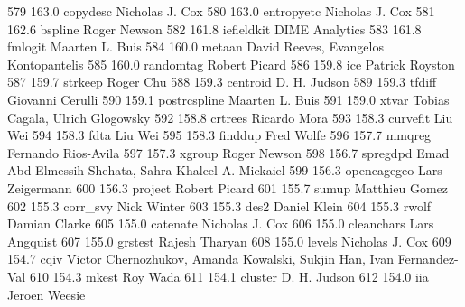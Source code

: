    579    163.0    copydesc      Nicholas J. Cox                         
   580    163.0    entropyetc    Nicholas J. Cox                         
   581    162.6    bspline       Roger Newson                            
   582    161.8    iefieldkit    DIME Analytics                          
   583    161.8    fmlogit       Maarten L. Buis                         
   584    160.0    metaan        David Reeves, Evangelos Kontopantelis   
   585    160.0    randomtag     Robert Picard                           
   586    159.8    ice           Patrick Royston                         
   587    159.7    strkeep       Roger Chu                               
   588    159.3    centroid      D. H. Judson                            
   589    159.3    tfdiff        Giovanni Cerulli                        
   590    159.1    postrcspline  Maarten L. Buis                         
   591    159.0    xtvar         Tobias Cagala, Ulrich Glogowsky         
   592    158.8    crtrees       Ricardo Mora                            
   593    158.3    curvefit      Liu Wei                                 
   594    158.3    fdta          Liu Wei                                 
   595    158.3    finddup       Fred Wolfe                              
   596    157.7    mmqreg        Fernando Rios-Avila                     
   597    157.3    xgroup        Roger Newson                            
   598    156.7    spregdpd      Emad Abd Elmessih Shehata, Sahra        
                                   Khaleel A. Mickaiel                     
   599    156.3    opencagegeo   Lars Zeigermann                         
   600    156.3    project       Robert Picard                           
   601    155.7    sumup         Matthieu Gomez                          
   602    155.3    corr_svy      Nick Winter                             
   603    155.3    des2          Daniel Klein                            
   604    155.3    rwolf         Damian Clarke                           
   605    155.0    catenate      Nicholas J. Cox                         
   606    155.0    cleanchars    Lars Angquist                           
   607    155.0    grstest       Rajesh Tharyan                          
   608    155.0    levels        Nicholas J. Cox                         
   609    154.7    cqiv          Victor Chernozhukov, Amanda Kowalski,   
                                   Sukjin Han, Ivan Fernandez-Val          
   610    154.3    mkest         Roy Wada                                
   611    154.1    cluster       D. H. Judson                            
   612    154.0    iia           Jeroen Weesie                           
